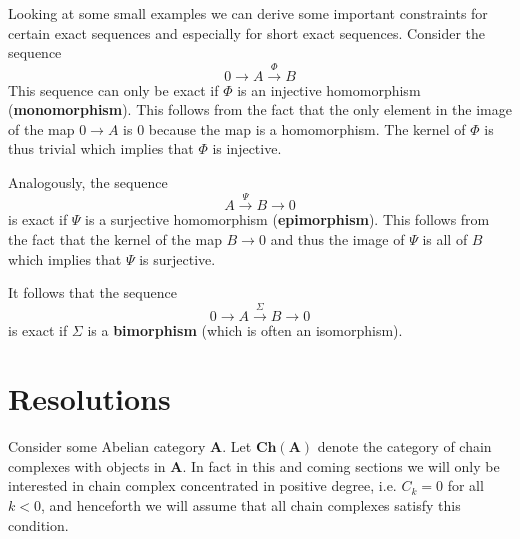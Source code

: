 
	\begin{property}
		Looking at some small examples we can derive some important constraints for certain exact sequences and especially for short exact sequences. Consider the sequence
		\[
			0\rightarrow A\xrightarrow{\Phi} B
		\]
		This sequence can only be exact if $\Phi$ is an injective homomorphism (\textbf{monomorphism}). This follows from the fact that the only element in the image of the map $0\rightarrow A$ is 0 because the map is a homomorphism. The kernel of $\Phi$ is thus trivial which implies that $\Phi$ is injective.

		Analogously, the sequence
		\[
			A\xrightarrow{\Psi}B\rightarrow0
		\]
		is exact if $\Psi$ is a surjective homomorphism (\textbf{epimorphism}). This follows from the fact that the kernel of the map $B\rightarrow0$ and thus the image of $\Psi$ is all of $B$ which implies that $\Psi$ is surjective.

		It follows that the sequence
		\[
			0\rightarrow A\xrightarrow{\Sigma}B\rightarrow0
		\]
		is exact if $\Sigma$ is a \textbf{bimorphism} (which is often an isomorphism).
	\end{property}

\section{Resolutions}

	Consider some Abelian category $\textbf{A}$. Let $\textbf{Ch}(\textbf{A})$ denote the category of chain complexes with objects in $\textbf{A}$. In fact in this and coming sections we will only be interested in chain complex concentrated in positive degree, i.e. $C_k=0$ for all $k<0$, and henceforth we will assume that all chain complexes satisfy this condition.


